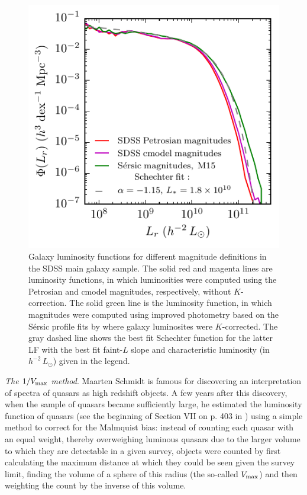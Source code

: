 \begin{figure}
\centerline{
\includegraphics[scale=1.5]{fig/lf_magdefs.pdf}}
\caption{ Galaxy luminosity functions for different magnitude definitions in the SDSS main galaxy sample. The solid red and magenta lines are luminosity functions, in which luminosities were computed using the Petrosian and cmodel magnitudes, respectively, without $K$-correction. The solid green line is the luminosity function, in which magnitudes were computed using improved photometry based on the S\'ersic profile fits by \protect\href{http://adsabs.harvard.edu/abs/2015MNRAS.446.3943M}{\citet{meert_etal15}} where galaxy luminosites were $K$-corrected. The gray dashed line shows the best fit Schechter function for the latter LF with the best fit faint-$L$ slope and characteristic luminosity (in $h^{-2}\, L_{\odot}$) given in the legend. \label{fig:lfmagdefs}}
\end{figure}

{\it The $1/V_{\rm max}$ method}.  Maarten Schmidt is famous for discovering an interpretation of spectra of quasars as high redshift objects. A few years after this discovery, when the sample of quasars became sufficiently large, he estimated the luminosity function of quasars (see the beginning of Section VII on p. 403 in \href{http://adsabs.harvard.edu/abs/1968ApJ...151..393S}{\citep{schmidt68}}) using a simple method to correct for the Malmquist bias: instead of counting each quasar with an equal weight, thereby overweighing luminous quasars due to the larger volume to which they are detectable in a given survey, objects were counted by first calculating the maximum distance at which they could be seen given the survey limit, finding the volume of a sphere of this radius (the so-called $V_{\rm max}$) and then weighting the count by the inverse of this volume.

